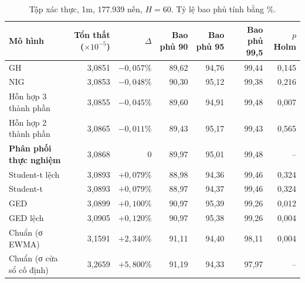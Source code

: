 \documentclass[11pt,a4paper]{article}
\begin{document}
\begin{table}[h]
\centering
\small
\caption{Tập xác thực, 1m, 177.939 nến, $H=60$. Tỷ lệ bao phủ tính bằng \%.}
\label{tab:p6-1m}
\begin{tabular}{lrrrrrr}
\toprule
Mô hình & Tổn thất ($\times10^{-5}$) & $\Delta$ & Bao phủ 90 & Bao phủ 95 & Bao phủ 99,5 & $p$ Holm \\
\midrule
GH & 3,0851 & $-0{,}057\%$ & 89,62 & 94,76 & 99,44 & 0,145 \\
NIG & 3,0853 & $-0{,}048\%$ & 90,30 & 95,12 & 99,38 & 0,216 \\
Hỗn hợp 3 thành phần & 3,0855 & $-0{,}045\%$ & 89,60 & 94,91 & 99,48 & 0,007 \\
Hỗn hợp 2 thành phần & 3,0865 & $-0{,}011\%$ & 89,43 & 95,17 & 99,43 & 0,565 \\
\textbf{Phân phối thực nghiệm} & 3,0868 & 0 & 89,97 & 95,01 & 99,48 & -- \\
Student-t lệch & 3,0893 & $+0{,}079\%$ & 88,98 & 94,36 & 99,46 & 0,324 \\
Student-t & 3,0893 & $+0{,}079\%$ & 88,97 & 94,37 & 99,46 & 0,324 \\
GED & 3,0899 & $+0{,}100\%$ & 90,97 & 95,39 & 99,26 & 0,012 \\
GED lệch & 3,0905 & $+0{,}120\%$ & 90,97 & 95,38 & 99,26 & 0,004 \\
Chuẩn (σ EWMA) & 3,1591 & $+2{,}340\%$ & 91,11 & 94,40 & 98,11 & 0,004 \\
Chuẩn (σ cửa sổ cố định) & 3,2659 & $+5{,}800\%$ & 91,19 & 94,33 & 97,97 & -- \\
\bottomrule
\end{tabular}
\end{table}
\end{document}

